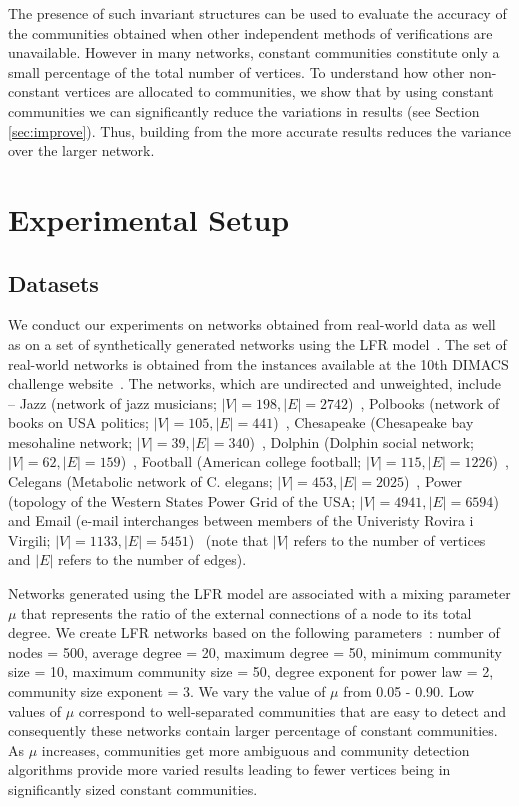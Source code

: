 The presence of such invariant structures can be used to evaluate the accuracy of the communities obtained when other independent methods of
verifications are unavailable.
However in many networks, constant communities constitute only a small percentage of the total number of vertices. To understand how other
non-constant vertices are allocated to communities, we show that by using constant communities we can significantly reduce the variations in
results (see Section \ref{sec:improve}). Thus, building from the more accurate results reduces the variance over the larger network. 



\section{Experimental Setup}

\subsection{Datasets} We conduct our experiments on networks obtained from real-world data as well as on a set of synthetically
generated networks using the LFR model~\cite{lfr2009}. The set of real-world networks is obtained from the instances available at the
10th DIMACS
challenge website~\cite{dimacs}. The networks, which are undirected and unweighted, include -- Jazz (network of jazz musicians;
$|V|=198, |E|=2742$)~\cite{jazz}, Polbooks (network of books on USA
politics; $|V|=105, |E|=441$)~\cite{polbooks}, Chesapeake (Chesapeake bay mesohaline network; $|V|=39, |E|=340$)~\cite{chesapeake},
Dolphin (Dolphin social network; $|V|=62, |E|=159$)~\cite{dolphin}, Football (American college football; $|V|=115,
|E|=1226$)~\cite{football}, Celegans (Metabolic network of C. elegans; $|V|=453, |E|=2025$)~\cite{PhysRevE.72.}, Power (topology of the
Western
States Power Grid of the USA; $|V|=4941, |E|=6594$)~\cite{Watts-1998} and Email (e-mail
interchanges between members of the Univeristy Rovira i Virgili; $|V|=1133, |E|=5451$)~\cite{email} (note that $|V|$ refers to the number
of vertices and $|E|$ refers to the number of edges).





Networks generated using the LFR model are associated with a mixing parameter $\mu$ that represents the ratio of the external connections
of a node to its total degree. We create LFR networks based on the following parameters~\cite{lf2012}: number of nodes = 500, average
degree = 20,
maximum
degree = 50, minimum community size = 10, maximum community size = 50, degree exponent for power law = 2, community size exponent = 3. We
vary the value of $\mu$ from 0.05 - 0.90. Low values of $\mu$ correspond to well-separated communities that are easy to detect and
consequently these networks contain larger percentage of constant communities. As $\mu$ increases, communities get more ambiguous and
community detection algorithms provide more varied results leading to fewer vertices being in significantly sized constant communities.

